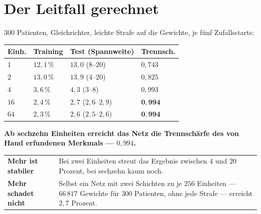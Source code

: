 \section{Der Leitfall gerechnet}

\begin{merksatz}
$300$ Patienten, Gleichrichter, leichte Strafe auf die Gewichte, je fünf Zufallsstarts:

\begin{center}
{\small
\renewcommand{\arraystretch}{1.46}
\begin{tabular}{@{}P{1.6cm}P{1.8cm}P{2.8cm}P{1.8cm}@{}}
\toprule
\textbf{Einh.} & \textbf{Training} & \textbf{Test (Spannweite)} & \textbf{Trennsch.}\\
\midrule
$1$ & $12{,}1\,\%$ & $13{,}0$ ($8$--$20$) & $0{,}743$\\
$2$ & $13{,}0\,\%$ & $13{,}9$ ($4$--$20$) & $0{,}825$\\
$4$ & $3{,}6\,\%$ & $4{,}3$ ($3$--$8$) & $0{,}993$\\
$16$ & $2{,}4\,\%$ & $2{,}7$ ($2{,}6$--$2{,}9$) & $\mathbf{0{,}994}$\\
$64$ & $2{,}3\,\%$ & $2{,}6$ ($2{,}5$--$2{,}6$) & $\mathbf{0{,}994}$\\
\bottomrule
\end{tabular}}
\end{center}

\begin{center}
\begin{minipage}{0.9\textwidth}
\textbf{Ab sechzehn Einheiten erreicht das Netz die Trennschärfe des von Hand erfundenen Merkmals --- $0{,}994$.}
\end{minipage}
\end{center}

\begin{center}
{\small
\renewcommand{\arraystretch}{1.5}
\begin{tabular}{@{}P{2.6cm}P{6.0cm}@{}}
\toprule
\textbf{Mehr ist stabiler} & Bei zwei Einheiten streut das Ergebnis zwischen $4$ und $20$ Prozent, bei sechzehn kaum noch.\\
\textbf{Mehr schadet nicht} & Selbst ein Netz mit zwei Schichten zu je $256$ Einheiten --- $66\,817$ Gewichte für $300$ Patienten, ohne jede Strafe --- erreicht $2{,}7$ Prozent.\\
\bottomrule
\end{tabular}}
\end{center}

\begin{center}
\begin{minipage}{0.88\textwidth}
\end{minipage}
\end{center}
\end{merksatz}

